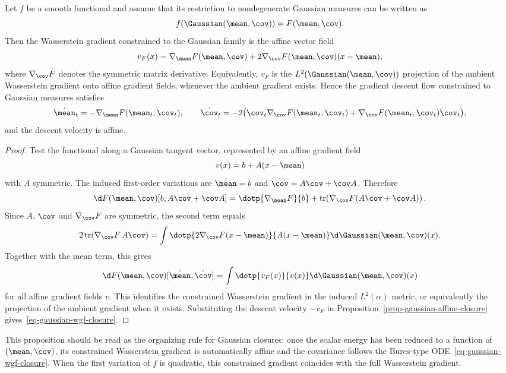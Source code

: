 \begin{prop}\label{prop-gaussian-gradient-bullet-list}
	Let $f$ be a smooth functional and assume that its restriction to nondegenerate Gaussian measures can be written as
	\[
		f(\Gaussian(\mean,\cov))=F(\mean,\cov).
	\]
	Then the Wasserstein gradient constrained to the Gaussian family is the affine vector field
	\[
		v_F(x)
		=
		\nabla_\mean F(\mean,\cov)
		+
		2\nabla_\cov F(\mean,\cov)(x-\mean),
	\]
	where $\nabla_\cov F$ denotes the symmetric matrix derivative. Equivalently, $v_F$ is the $L^2(\Gaussian(\mean,\cov))$ projection of the ambient Wasserstein gradient onto affine gradient fields, whenever the ambient gradient exists. Hence the gradient descent flow constrained to Gaussian measures satisfies
	\begin{equation}\label{eq-gaussian-wgf-closure}
		\dot\mean_t=-\nabla_\mean F(\mean_t,\cov_t),
		\qquad
		\dot\cov_t=-2\bigl(\cov_t\nabla_\cov F(\mean_t,\cov_t)+\nabla_\cov F(\mean_t,\cov_t)\cov_t\bigr),
	\end{equation}
	and the descent velocity is affine.
\end{prop}

\begin{proof}
	Test the functional along a Gaussian tangent vector, represented by an affine gradient field
	\[
		v(x)=b+A(x-\mean)
	\]
	with $A$ symmetric. The induced first-order variations are $\dot\mean=b$ and $\dot\cov=A\cov+\cov A$. Therefore
	\[
		\d F(\mean,\cov)[b,A\cov+\cov A]
		=
		\dotp{\nabla_\mean F}{b}
		+
		\mathrm{tr}\!\left(\nabla_\cov F(A\cov+\cov A)\right).
	\]
	Since $A$, $\cov$ and $\nabla_\cov F$ are symmetric, the second term equals
	\[
		2\,\mathrm{tr}(\nabla_\cov F\,A\cov)
		=
		\int \dotp{2\nabla_\cov F(x-\mean)}{A(x-\mean)}\d\Gaussian(\mean,\cov)(x).
	\]
	Together with the mean term, this gives
	\[
		\d F(\mean,\cov)[\dot\mean,\dot\cov]
		=
		\int \dotp{v_F(x)}{v(x)}\d\Gaussian(\mean,\cov)(x)
	\]
	for all affine gradient fields $v$. This identifies the constrained Wasserstein gradient in the induced $L^2(\alpha)$ metric, or equivalently the projection of the ambient gradient when it exists. Substituting the descent velocity $-v_F$ in Proposition~\ref{prop-gaussian-affine-closure} gives~\eqref{eq-gaussian-wgf-closure}.
\end{proof}

This proposition should be read as the organizing rule for Gaussian closures: once the scalar energy has been reduced to a function of $(\mean,\cov)$, its constrained Wasserstein gradient is automatically affine and the covariance follows the Bures-type ODE~\eqref{eq-gaussian-wgf-closure}. When the first variation of $f$ is quadratic, this constrained gradient coincides with the full Wasserstein gradient.

